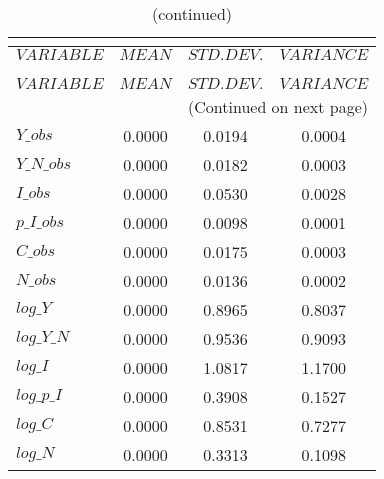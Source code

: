  
\begin{center}
\begin{longtable}{lccc} 
\caption{THEORETICAL MOMENTS}\\
 \label{Table:th_moments}\\
\toprule 
$VARIABLE   $	 & 	 $         MEAN$	 & 	 $    STD. DEV.$	 & 	 $     VARIANCE$\\
\midrule \endfirsthead 
\caption{(continued)}\\
 \toprule \\ 
$VARIABLE   $	 & 	 $         MEAN$	 & 	 $    STD. DEV.$	 & 	 $     VARIANCE$\\
\midrule \endhead 
\midrule \multicolumn{4}{r}{(Continued on next page)} \\ \bottomrule \endfoot 
\bottomrule \endlastfoot 
$Y\_obs     $	 & 	       0.0000	 & 	       0.0194	 & 	       0.0004 \\ 
$Y\_N\_obs  $	 & 	       0.0000	 & 	       0.0182	 & 	       0.0003 \\ 
$I\_obs     $	 & 	       0.0000	 & 	       0.0530	 & 	       0.0028 \\ 
$p\_I\_obs  $	 & 	       0.0000	 & 	       0.0098	 & 	       0.0001 \\ 
$C\_obs     $	 & 	       0.0000	 & 	       0.0175	 & 	       0.0003 \\ 
$N\_obs     $	 & 	       0.0000	 & 	       0.0136	 & 	       0.0002 \\ 
$log\_Y     $	 & 	       0.0000	 & 	       0.8965	 & 	       0.8037 \\ 
$log\_Y\_N  $	 & 	       0.0000	 & 	       0.9536	 & 	       0.9093 \\ 
$log\_I     $	 & 	       0.0000	 & 	       1.0817	 & 	       1.1700 \\ 
$log\_p\_I  $	 & 	       0.0000	 & 	       0.3908	 & 	       0.1527 \\ 
$log\_C     $	 & 	       0.0000	 & 	       0.8531	 & 	       0.7277 \\ 
$log\_N     $	 & 	       0.0000	 & 	       0.3313	 & 	       0.1098 \\ 
\end{longtable}
 \end{center}
